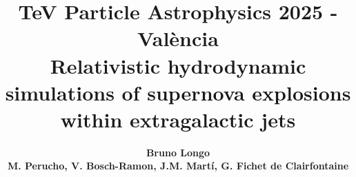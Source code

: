 \documentclass[unknownkeysallowed,table]{beamer}
\title[]{{\small TeV Particle Astrophysics 2025 - València}\vspace{.5cm} \\
\bf{Relativistic hydrodynamic simulations of supernova explosions within extragalactic jets}}
\author[]{\huge \bf{ Bruno Longo} \\
{\scriptsize M. Perucho, V. Bosch-Ramon, J.M. Mart\'i, G. Fichet de Clairfontaine}}
\institute[]{Departament d'Astronomia i Astrof\'isica, Universitat de València }
\begin{document}
\begin{frame}[plain]
\maketitle
\end{frame}



\end{document}
